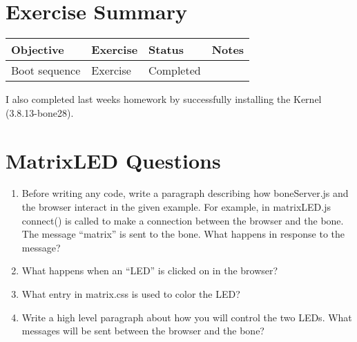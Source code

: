 \documentclass[letterpaper,10pt]{texMemo}
\begin{document}
\maketitle

\section{Exercise Summary}

\begin{center}
\begin{tabular}{|p{4cm}|l|l|p{8cm}|}
\hline
\textbf{Objective} & \textbf{Exercise} &\textbf{Status} & \textbf{Notes}\\
\hline
 Boot sequence & Exercise  & Completed & \\
\hline
\end{tabular}
\end{center}

\noindent I also completed last weeks homework by successfully installing the
Kernel (3.8.13-bone28).

\section{MatrixLED Questions}
\begin{enumerate}
 \item Before writing any code, write a paragraph describing how
boneServer.js and the browser interact in the given example. For example,
in matrixLED.js connect() is called to make a connection between the browser and
the bone. The message “matrix” is sent to the bone. What happens in response
to the message?
  \item What happens when an “LED” is clicked on in the browser?
  \item What entry in matrix.css is used to color the LED?
  \item Write a high level paragraph about how you will control the two
LEDs. What messages will be sent between the browser and the bone?
\end{enumerate}
\end{document}
